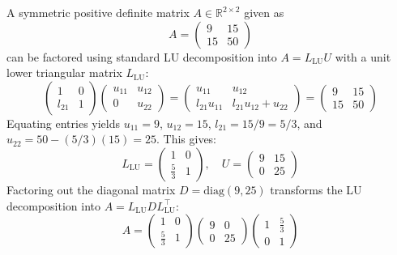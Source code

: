 \begin{enumerate}[label=\thesubsection.\arabic*, ref=\thesubsection.\theenumi, itemsep=0pt, leftmargin=*]
\solution A symmetric positive definite matrix $A \in \mathbb{R}^{2 \times 2}$ given as
\[
    A = \begin{pmatrix} 9 & 15 \\ 15 & 50 \end{pmatrix}
\]
can be factored using standard LU decomposition into $A = L_{\text{LU}} U$ with a unit lower triangular matrix $L_{\text{LU}}$:
\begin{equation}
    \begin{pmatrix} 1 & 0 \\ l_{21} & 1 \end{pmatrix} \begin{pmatrix} u_{11} & u_{12} \\ 0 & u_{22} \end{pmatrix} = \begin{pmatrix} u_{11} & u_{12} \\ l_{21}u_{11} & l_{21}u_{12} + u_{22} \end{pmatrix} = \begin{pmatrix} 9 & 15 \\ 15 & 50 \end{pmatrix} \label{eq:lu_system}
\end{equation}
Equating entries yields $u_{11} = 9$, $u_{12} = 15$, $l_{21} = 15/9 = 5/3$, and $u_{22} = 50 - (5/3)(15) = 25$. This gives:
\begin{equation}
    L_{\text{LU}} = \begin{pmatrix} 1 & 0 \\ \frac{5}{3} & 1 \end{pmatrix}, \quad U = \begin{pmatrix} 9 & 15 \\ 0 & 25 \end{pmatrix} \label{eq:lu_result}
\end{equation}
Factoring out the diagonal matrix $D = \text{diag}(9, 25)$ transforms the LU decomposition into $A = L_{\text{LU}} D L_{\text{LU}}^\top$:
\begin{equation}
    A = \begin{pmatrix} 1 & 0 \\ \frac{5}{3} & 1 \end{pmatrix} \begin{pmatrix} 9 & 0 \\ 0 & 25 \end{pmatrix} \begin{pmatrix} 1 & \frac{5}{3} \\ 0 & 1 \end{pmatrix} \label{eq:ldl_result}

\end{equation}
\end{enumerate}
